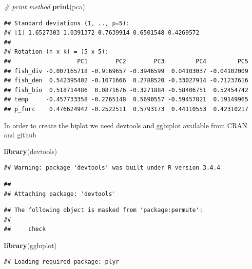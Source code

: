 \documentclass[]{article}
\newenvironment{Shaded}{\begin{snugshade}}{\end{snugshade}}
\newcommand{\KeywordTok}[1]{\textcolor[rgb]{0.13,0.29,0.53}{\textbf{#1}}}
\newcommand{\CommentTok}[1]{\textcolor[rgb]{0.56,0.35,0.01}{\textit{#1}}}
\newcommand{\NormalTok}[1]{#1}
\begin{document}
\begin{Shaded}
\begin{Highlighting}[]
\CommentTok{# print method}
\KeywordTok{print}\NormalTok{(pca)}
\end{Highlighting}
\end{Shaded}

\begin{verbatim}
## Standard deviations (1, .., p=5):
## [1] 1.6527303 1.0391372 0.7639914 0.6501548 0.4269572
## 
## Rotation (n x k) = (5 x 5):
##                   PC1        PC2        PC3         PC4         PC5
## fish_div -0.007165718 -0.9169657 -0.3946599  0.04103037 -0.04102009
## fish_den  0.542395402 -0.1071666  0.2788520 -0.33027914 -0.71237616
## fish_bio  0.518714486  0.0871676 -0.3271884 -0.58406751  0.52454742
## temp     -0.457733358 -0.2765148  0.5690557 -0.59457821  0.19149965
## p_furc    0.476624942 -0.2522511  0.5793173  0.44110553  0.42310217
\end{verbatim}

In order to create the biplot we need devtools and ggbiplot available
from CRAN and github

\begin{Shaded}
\begin{Highlighting}[]
\KeywordTok{library}\NormalTok{(devtools)}
\end{Highlighting}
\end{Shaded}

\begin{verbatim}
## Warning: package 'devtools' was built under R version 3.4.4
\end{verbatim}

\begin{verbatim}
## 
## Attaching package: 'devtools'
\end{verbatim}

\begin{verbatim}
## The following object is masked from 'package:permute':
## 
##     check
\end{verbatim}

\begin{Shaded}
\begin{Highlighting}[]
\KeywordTok{library}\NormalTok{(ggbiplot)}
\end{Highlighting}
\end{Shaded}

\begin{verbatim}
## Loading required package: plyr
\end{verbatim}
\end{document}
